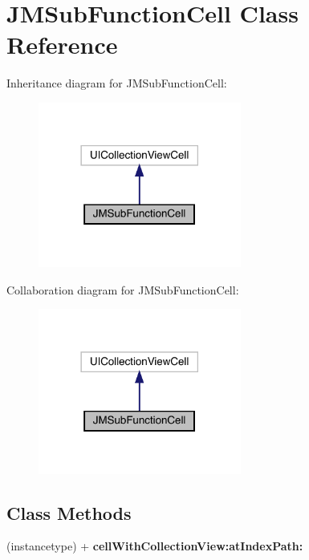 \hypertarget{interface_j_m_sub_function_cell}{}\section{J\+M\+Sub\+Function\+Cell Class Reference}
\label{interface_j_m_sub_function_cell}


Inheritance diagram for J\+M\+Sub\+Function\+Cell\+:\nopagebreak
\begin{figure}[H]
\begin{center}
\leavevmode
\includegraphics[width=189pt]{interface_j_m_sub_function_cell__inherit__graph}
\end{center}
\end{figure}


Collaboration diagram for J\+M\+Sub\+Function\+Cell\+:\nopagebreak
\begin{figure}[H]
\begin{center}
\leavevmode
\includegraphics[width=189pt]{interface_j_m_sub_function_cell__coll__graph}
\end{center}
\end{figure}
\subsection*{Class Methods}
\begin{DoxyCompactItemize}
\item 
\mbox{\label{interface_j_m_sub_function_cell_a9ae64920b03c5b19be0990e70647c2fc}} 
(instancetype) + {\bfseries cell\+With\+Collection\+View\+:at\+Index\+Path\+:}
\end{DoxyCompactItemize}
